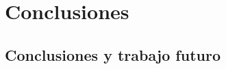 \cleardoublepage

\chapter{Conclusiones}
\label{ch:chapter6}

\section{Conclusiones y trabajo futuro}

